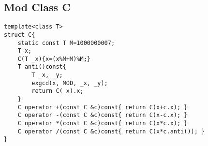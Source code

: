 \subsection{Mod Class C}
\begin{lstlisting}
template<class T>
struct C{
	static const T M=1000000007;
	T x;
	C(T _x){x=(x%M+M)%M;}
	T anti()const{
		T _x, _y;
		exgcd(x, MOD, _x, _y);
		return C(_x).x; 
	}
	C operator +(const C &c)const{ return C(x+c.x); }
	C operator -(const C &c)const{ return C(x-c.x); }
	C operator *(const C &c)const{ return C(x*c.x); }
	C operator /(const C &c)const{ return C(x*c.anti()); }
}
\end{lstlisting}

